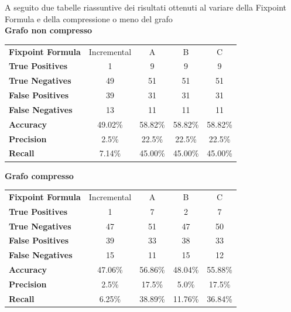 \documentclass[a4paper,10pt]{article}
\begin{document}
A seguito due tabelle riassuntive dei risultati ottenuti al variare della Fixpoint Formula e della compressione o meno del grafo\\

\textbf{Grafo non compresso}

\begin{center}
\begin{tabular}{| l | c | c | c | c |}
	\hline
	\textbf{Fixpoint Formula} & Incremental & A & B & C\\
	\hhline{|=|=|=|=|=|}
	\textbf{True Positives} & 1 & 9 & 9 & 9\\
	\hline
	\textbf{True Negatives} & 49 & 51 & 51 & 51\\
	\hline
	\textbf{False Positives} & 39 & 31 & 31 & 31\\
	\hline
	\textbf{False Negatives} & 13 & 11 & 11 & 11\\
	\hline
	\textbf{Accuracy} & 49.02\% & 58.82\% & 58.82\% & 58.82\%\\
	\hline
	\textbf{Precision} & 2.5\% & 22.5\% & 22.5\% & 22.5\%\\
	\hline
	\textbf{Recall} & 7.14\% & 45.00\% & 45.00\% & 45.00\%\\
	\hline
\end{tabular}
\end{center}
\vspace{4mm}

\textbf{Grafo compresso}

\begin{center}
\begin{tabular}{| l | c | c | c | c |}
	\hline
	\textbf{Fixpoint Formula} & Incremental & A & B & C\\
	\hhline{|=|=|=|=|=|}
	\textbf{True Positives} & 1 & 7 & 2 & 7\\
	\hline
	\textbf{True Negatives} & 47 & 51 & 47 & 50\\
	\hline
	\textbf{False Positives} & 39 & 33 & 38 & 33\\
	\hline
	\textbf{False Negatives} & 15 & 11 & 15 & 12\\
	\hline
	\textbf{Accuracy} & 47.06\% & 56.86\% & 48.04\% & 55.88\%\\
	\hline
	\textbf{Precision} & 2.5\% & 17.5\% & 5.0\% & 17.5\%\\
	\hline
	\textbf{Recall} & 6.25\% & 38.89\% & 11.76\% & 36.84\%\\
	\hline
\end{tabular}
\end{center}
\vspace{2mm}
\end{document}
